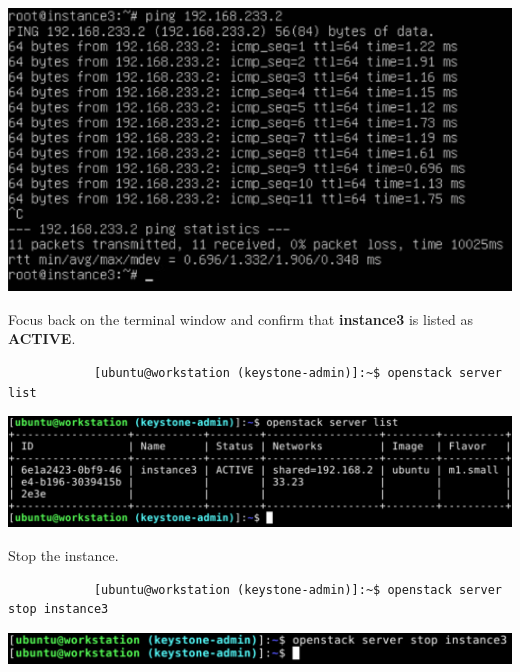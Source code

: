 \documentclass[letterpaper, 12pt]{article}
\begin{document}
\begin{enumerate}
\begin{labstep}
        \begin{center}
            \includegraphics[width=\linewidth]{images/part4/step15.png}
        \end{center}
    \end{labstep}

    \begin{labstep}
        Focus back on the terminal window and confirm that \textbf{instance3} is listed as \textbf{ACTIVE}.
        \begin{lstlisting}
            [ubuntu@workstation (keystone-admin)]:~$ openstack server list
        \end{lstlisting}

        \begin{center}
            \includegraphics[width=\linewidth]{images/part4/step16.png}
        \end{center}
    \end{labstep}

    \begin{labstep}
        Stop the instance.
        \begin{lstlisting}
            [ubuntu@workstation (keystone-admin)]:~$ openstack server stop instance3
        \end{lstlisting}

        \begin{center}
            \includegraphics[width=\linewidth]{images/part4/step17.png}
        \end{center}
    \end{labstep}


\end{enumerate}
\end{document}
